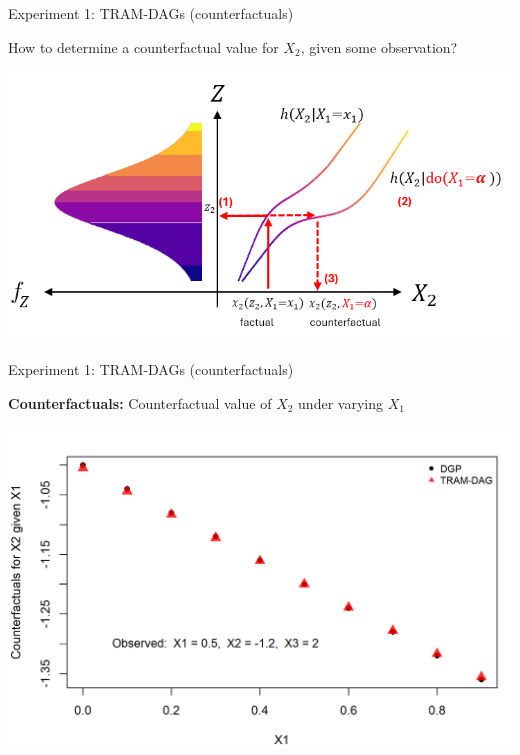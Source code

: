 \documentclass[onlytextwidth,english]{beamer}\usepackage[]{graphicx}\usepackage[]{xcolor}
\begin{document}
% 
% 
% 
% 
% 
% 
% 
% 
% 





\begin{frame}{Experiment 1: TRAM-DAGs (counterfactuals)}

How to determine a counterfactual value for $X_2$, given some observation?

  \centering
  \includegraphics[width=0.95\linewidth]{img/experiment1/counterfactuals.png}

\end{frame}






\begin{frame}{Experiment 1: TRAM-DAGs (counterfactuals)}

\textbf{Counterfactuals:} Counterfactual value of $X_2$ under varying $X_1$

  \centering
  \includegraphics[width=0.9\linewidth]{img/experiment1/exp1_counterfactuals.png}

\end{frame}
\end{document}

